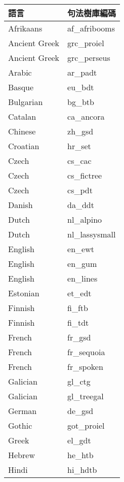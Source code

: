 \begin{table}[h!]
\centering
\begin{subtable}[t]{.5\textwidth}
    \begin{tabular}[t]{|l l|}
        \hline
        \textbf{語言} & \textbf{句法樹庫編碼} \\
        \hline
        Afrikaans & af\_afribooms \\
        Ancient Greek & grc\_proiel \\
        Ancient Greek & grc\_perseus \\
        Arabic & ar\_padt \\
        Basque & eu\_bdt \\
        Bulgarian & bg\_btb \\
        Catalan & ca\_ancora \\
        Chinese & zh\_gsd \\
        Croatian & hr\_set \\
        Czech & cs\_cac \\
        Czech & cs\_fictree \\
        Czech & cs\_pdt \\
        Danish & da\_ddt \\
        Dutch & nl\_alpino \\
        Dutch & nl\_lassysmall \\
        English & en\_ewt \\
        English & en\_gum \\
        English & en\_lines \\
        Estonian & et\_edt \\
        Finnish & fi\_ftb \\
        Finnish & fi\_tdt \\
        French & fr\_gsd \\
        French & fr\_sequoia \\
        French & fr\_spoken \\
        Galician & gl\_ctg \\
        Galician & gl\_treegal \\
        German & de\_gsd \\
        Gothic & got\_proiel \\
        Greek & el\_gdt \\
        Hebrew & he\_htb \\
        Hindi & hi\_hdtb \\

\end{tabular}
\end{subtable}
\end{table}
